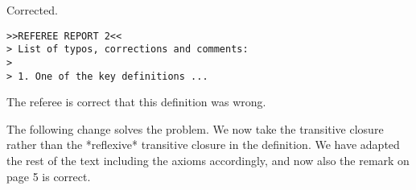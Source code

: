 \documentclass{article}
\begin{document}
Corrected.

\begin{verbatim} 
>>REFEREE REPORT 2<<
> List of typos, corrections and comments:
>
> 1. One of the key definitions ...
\end{verbatim}

The referee is correct that this definition was wrong.

The following change solves the problem. We now take the transitive
closure rather than the *reflexive* transitive closure in the
definition. We have adapted the rest of the text including the
axioms accordingly, and now also the remark on page 5 is correct.
\end{document}
